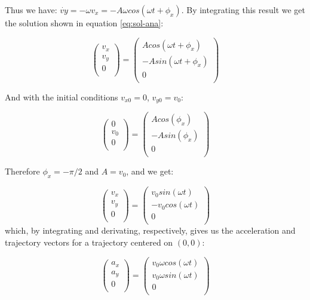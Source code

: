 \documentclass[a4paper,12pt,twoside]{article}
\begin{document}
Thus we have: $\dot{vy} = -\omega v_x = -A \omega cos (\omega t + \phi_x)$. By integrating this result we get the solution shown in equation \ref{eq:sol-ana}:

\begin{equation*}
	\begin{pmatrix} v_x\\ v_y\\ 0\\ \end{pmatrix} = \begin{pmatrix} Acos(\omega t + \phi_x)\\ -Asin(\omega t + \phi_x)\\ 0\\ \end{pmatrix}
\end{equation*}

And with the initial conditions $v_{x0}=0$, $v_{y0}=v_0$:

\begin{equation*}
	\begin{pmatrix} 0\\ v_0\\ 0\\ \end{pmatrix} = \begin{pmatrix} Acos(\phi_x)\\ -Asin(\phi_x)\\ 0\\ \end{pmatrix}
\end{equation*}

Therefore $\phi_x = -\pi /2$ and $A=v_0$, and we get:

\begin{equation*}
	\begin{pmatrix} v_x\\ v_y\\ 0\\ \end{pmatrix} = \begin{pmatrix} v_0 sin(\omega t)\\ -v_0 cos(\omega t)\\ 0\\ \end{pmatrix}
\end{equation*}
which, by integrating and derivating, respectively, gives us the acceleration and trajectory vectors for a trajectory centered on $(0,0)$:

\begin{equation*}
	\begin{pmatrix} a_x\\ a_y\\ 0\\ \end{pmatrix} = \begin{pmatrix} v_0 \omega cos(\omega t)\\ v_0 \omega sin(\omega t)\\ 0\\ \end{pmatrix}
\end{equation*}
\end{document}
